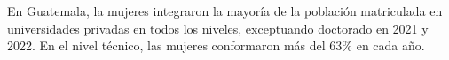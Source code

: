 En Guatemala, la mujeres integraron la mayoría de la población matriculada en universidades privadas en todos los niveles, exceptuando doctorado en 2021 y 2022. En el nivel técnico, las mujeres conformaron más del 63\% en cada año. 